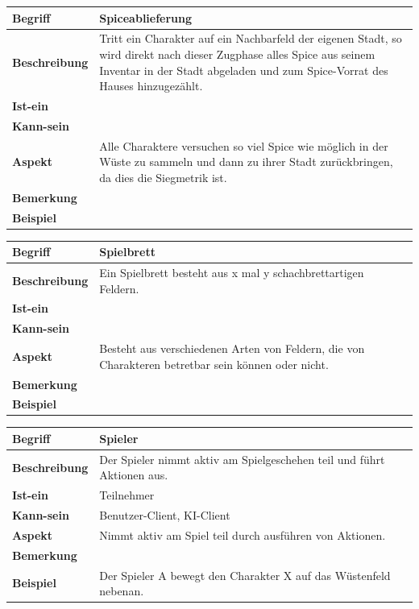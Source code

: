 \documentclass[12pt]{article}
\begin{document}
\begin{tabularx}{16cm}{|l|X|}
\hline
\textbf{Begriff} & \textbf{Spiceablieferung} \\
\hline
\textbf{Beschreibung} & Tritt ein Charakter auf ein Nachbarfeld der eigenen Stadt, so wird direkt nach dieser Zugphase alles Spice aus seinem Inventar in der Stadt abgeladen und zum Spice-Vorrat des Hauses hinzugezählt. \\
\hline
\textbf{Ist-ein} & \\
\hline
\textbf{Kann-sein} & \\
\hline
\textbf{Aspekt} & Alle Charaktere versuchen so viel Spice wie möglich in der Wüste zu sammeln und dann zu ihrer Stadt zurückbringen, da dies die Siegmetrik ist.\\
\hline
\textbf{Bemerkung} &  \\
\hline
\textbf{Beispiel} &  \\
\hline
\end{tabularx}

\begin{tabularx}{16cm}{|l|X|}
\hline
\textbf{Begriff} & \textbf{Spielbrett} \\
\hline
\textbf{Beschreibung} & Ein Spielbrett besteht aus x mal y schachbrettartigen Feldern.  \\
\hline
\textbf{Ist-ein} & \\
\hline
\textbf{Kann-sein} & \\
\hline
\textbf{Aspekt} & Besteht aus verschiedenen Arten von Feldern, die von Charakteren betretbar sein können oder nicht. \\
\hline
\textbf{Bemerkung} &  \\
\hline
\textbf{Beispiel} &  \\
\hline
\end{tabularx}

\begin{tabularx}{16cm}{|l|X|}
\hline
\textbf{Begriff} & \textbf{Spieler} \\
\hline
\textbf{Beschreibung} & Der Spieler nimmt aktiv am Spielgeschehen teil und führt Aktionen aus. \\
\hline
\textbf{Ist-ein} & Teilnehmer \\
\hline
\textbf{Kann-sein} & Benutzer-Client, KI-Client\\
\hline
\textbf{Aspekt} & Nimmt aktiv am Spiel teil durch ausführen von Aktionen.\\
\hline
\textbf{Bemerkung} &  \\
\hline
\textbf{Beispiel} & Der Spieler A bewegt den Charakter X auf das Wüstenfeld nebenan. \\
\hline
\end{tabularx}
\end{document}
